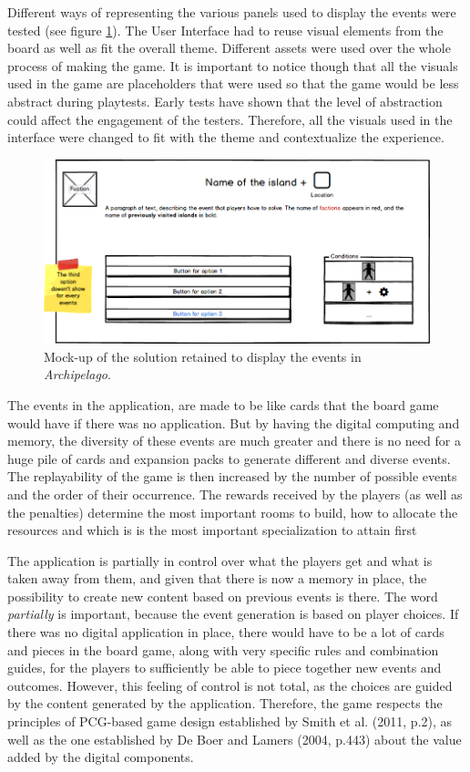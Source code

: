 Different ways of representing the various panels used to display the events were tested (see figure \ref{fig:uimockup}). The User Interface had to reuse visual elements from the board as well as fit the overall theme. Different assets were used over the whole process of making the game. It is important to notice though that all the visuals used in the game are placeholders that were used so that the game would be less abstract during playtests. Early tests have shown that the level of abstraction could affect the engagement of the testers. Therefore, all the visuals used in the interface were changed to fit with the theme and contextualize the experience.
\begin{figure}[!ht]
    \centering
    \includegraphics[width=\textwidth]{Images/event.png}
    \caption{Mock-up of the solution retained to display the events in \textit{Archipelago}.}
    \label{fig:uimockup}
\end{figure}

The events in the application, are made to be like cards that the board game would have if there was no application. But by having the digital computing and memory, the diversity of these events are much greater and there is no need for a huge pile of cards and expansion packs to generate different and diverse events. The replayability of the game is then increased by the number of possible events and the order of their occurrence. The rewards received by the players (as well as the penalties) determine the most important rooms to build, how to allocate the resources and which is is the most important specialization to attain first

The application is partially in control over what the players get and what is taken away from them, and given that there is now a memory in place, the possibility to create new content based on previous events is there. The word \textit{partially} is important, because the event generation is based on player choices. If there was no digital application in place, there would have to be a lot of cards and pieces in the board game, along with very specific rules and combination guides, for the players to sufficiently be able to piece together new events and outcomes. However, this feeling of control is not total, as the choices are guided by the content generated by the application. Therefore, the game respects the principles of PCG-based game design established by Smith et al. (2011, p.2)\cite{pdf:pcgbased}, as well as the one established by De Boer and Lamers (2004, p.443)\cite{chap:aug} about the value added by the digital components.

